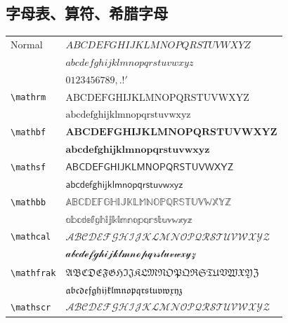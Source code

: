\subsection{字母表、算符、希腊字母\the\baselineskip}
\begin{tabular}{ll}
    Normal           & $ABCDEFGHIJKLMNOPQRSTUVWXYZ$            \\
                     & $abcdefghijklmnopqrstuvwxyz$            \\
                     & $0123456789,.!'$                        \\
    \verb|\mathrm|   & $\mathrm{ABCDEFGHIJKLMNOPQRSTUVWXYZ}$   \\
                     & $\mathrm{abcdefghijklmnopqrstuvwxyz}$   \\
    \verb|\mathbf|   & $\mathbf{ABCDEFGHIJKLMNOPQRSTUVWXYZ}$   \\
                     & $\mathbf{abcdefghijklmnopqrstuvwxyz}$   \\
    \verb|\mathsf|   & $\mathsf{ABCDEFGHIJKLMNOPQRSTUVWXYZ}$   \\
                     & $\mathsf{abcdefghijklmnopqrstuvwxyz}$   \\
    \verb|\mathbb|   & $\mathbb{ABCDEFGHIJKLMNOPQRSTUVWXYZ}$   \\
                     & $\mathbb{abcdefghijklmnopqrstuvwxyz}$   \\
    \verb|\mathcal|  & $\mathcal{ABCDEFGHIJKLMNOPQRSTUVWXYZ}$  \\
                     & $\mathcal{abcdefghijklmnopqrstuvwxyz}$  \\
    \verb|\mathfrak| & $\mathfrak{ABCDEFGHIJKLMNOPQRSTUVWXYZ}$ \\
                     & $\mathfrak{abcdefghijklmnopqrstuvwxyz}$ \\
    \verb|\mathscr|  & $\mathscr{ABCDEFGHIJKLMNOPQRSTUVWXYZ}$
\end{tabular}

